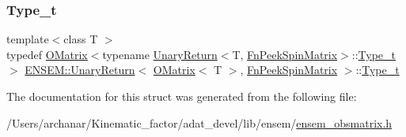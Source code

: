 \subsubsection{\texorpdfstring{Type\_t}{Type\_t}\hspace{0.1cm}{\footnotesize\ttfamily [2/2]}}
{\footnotesize\ttfamily template$<$class T $>$ \\
typedef \mbox{\hyperlink{classENSEM_1_1OMatrix}{O\+Matrix}}$<$typename \mbox{\hyperlink{structENSEM_1_1UnaryReturn}{Unary\+Return}}$<$T, \mbox{\hyperlink{structENSEM_1_1FnPeekSpinMatrix}{Fn\+Peek\+Spin\+Matrix}}$>$\+::\mbox{\hyperlink{structENSEM_1_1UnaryReturn_3_01OMatrix_3_01T_01_4_00_01FnPeekSpinMatrix_01_4_a9a23ee99cd498ef33180f667eae28655}{Type\+\_\+t}}$>$ \mbox{\hyperlink{structENSEM_1_1UnaryReturn}{E\+N\+S\+E\+M\+::\+Unary\+Return}}$<$ \mbox{\hyperlink{classENSEM_1_1OMatrix}{O\+Matrix}}$<$ T $>$, \mbox{\hyperlink{structENSEM_1_1FnPeekSpinMatrix}{Fn\+Peek\+Spin\+Matrix}} $>$\+::\mbox{\hyperlink{structENSEM_1_1UnaryReturn_3_01OMatrix_3_01T_01_4_00_01FnPeekSpinMatrix_01_4_a9a23ee99cd498ef33180f667eae28655}{Type\+\_\+t}}}



The documentation for this struct was generated from the following file\+:\begin{DoxyCompactItemize}
\item 
/\+Users/archanar/\+Kinematic\+\_\+factor/adat\+\_\+devel/lib/ensem/\mbox{\hyperlink{lib_2ensem_2ensem__obsmatrix_8h}{ensem\+\_\+obsmatrix.\+h}}\end{DoxyCompactItemize}
